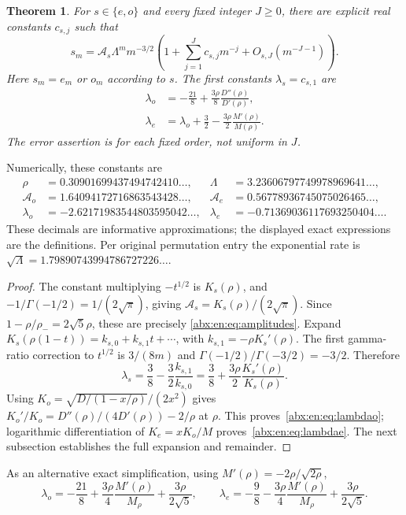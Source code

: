 \documentclass[11pt,letterpaper]{article}
\numberwithin{equation}{section}
\newtheorem{theorem}{Theorem}[section]
\theoremstyle{remark}\newtheorem{remark}[theorem]{Remark}
\begin{document}
\begin{theorem}\label{abx:en:thm:asymptotic}
For $s\in\{e,o\}$ and every fixed integer $J\ge0$, there are
explicit real constants $c_{s,j}$ such that
\begin{equation}\label{abx:en:eq:allorders}
 s_m=\mathcal A_s\Lambda^m m^{-3/2}
 \left(1+\sum_{j=1}^{J}c_{s,j}m^{-j}
             +O_{s,J}(m^{-J-1})\right).
\end{equation}
Here $s_m=e_m$ or $o_m$ according to $s$. The first constants
$\lambda_s=c_{s,1}$ are
\begin{align}
 \lambda_o&=-\frac{21}{8}
       +\frac{3\rho}{8}\frac{D''(\rho)}{D'(\rho)},\label{abx:en:eq:lambdao}\\
 \lambda_e&=\lambda_o+\frac32
       -\frac{3\rho}{2}\frac{M'(\rho)}{M(\rho)}.\label{abx:en:eq:lambdae}
\end{align}
The error assertion is for each fixed order, not uniform in $J$.
\end{theorem}
Numerically, these constants are
\begin{align*}
 \rho&=0.30901699437494742410\ldots,&
 \Lambda&=3.23606797749978969641\ldots,\\
 \mathcal A_o&=1.64094172716863543428\ldots,&
 \mathcal A_e&=0.56778936745075026465\ldots,\\
 \lambda_o&=-2.62171983544803595042\ldots,&
 \lambda_e&=-0.71369036117693250404\ldots.
\end{align*}
These decimals are informative approximations; the displayed exact
expressions are the definitions. Per original permutation entry the
exponential rate is
$\sqrt\Lambda=1.79890743994786727226\ldots$.

\begin{proof}
The constant multiplying $-t^{1/2}$ is $K_s(\rho)$, and
$-1/\Gamma(-1/2)=1/(2\sqrt\pi)$, giving
$\mathcal A_s=K_s(\rho)/(2\sqrt\pi)$. Since
$1-\rho/\rho_-=2\sqrt5\rho$, these are precisely
\eqref{abx:en:eq:amplitudes}.
Expand $K_s(\rho(1-t))=k_{s,0}+k_{s,1}t+\cdots$, with
$k_{s,1}=-\rho K_s'(\rho)$. The first gamma-ratio correction to
$t^{1/2}$ is $3/(8m)$ and
$\Gamma(-1/2)/\Gamma(-3/2)=-3/2$. Therefore
\begin{equation}\label{abx:en:eq:lambdaK}
 \lambda_s=\frac38-\frac32\frac{k_{s,1}}{k_{s,0}}
           =\frac38+\frac{3\rho}{2}\frac{K_s'(\rho)}{K_s(\rho)}.
\end{equation}
Using $K_o=\sqrt{D/(1-x/\rho)}/(2x^2)$ gives
$K_o'/K_o=D''(\rho)/(4D'(\rho))-2/\rho$ at $\rho$.
This proves~\eqref{abx:en:eq:lambdao}; logarithmic differentiation of
$K_e=xK_o/M$ proves~\eqref{abx:en:eq:lambdae}. The next subsection
establishes the full expansion and remainder.
\end{proof}
As an alternative exact simplification, using $M'(\rho)=-2\rho/\sqrt{2\rho}$,
\[
 \lambda_o=-\frac{21}{8}
      +\frac{3\rho}{4}\frac{M'(\rho)}{M_\rho}
      +\frac{3\rho}{2\sqrt5},\qquad
 \lambda_e=-\frac98
      -\frac{3\rho}{4}\frac{M'(\rho)}{M_\rho}
      +\frac{3\rho}{2\sqrt5}.
\]
\end{document}
